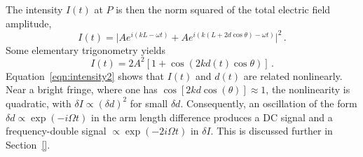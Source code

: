 \documentclass[paper-main.tex]{subfiles}
\begin{document}
The intensity $I(t)$ at $P$ is then the norm squared of the total electric field amplitude,
\begin{equation}
I(t) = \lvert A e^{i (k L - \omega t)}  + A e^{i (k (L + 2 d \cos{\theta}) - \omega t)} \rvert^2\,.
\label{eqn:intensity1}    
\end{equation}
Some elementary trigonometry yields
\begin{equation}
I(t) = 2 A^2 \left[ 1 + \cos{\left( 2 k d(t) \cos{\theta} \right) } \right]  \label{eqn:intensity2}\,.
\end{equation}
Equation~\ref{eqn:intensity2} shows that $I(t)$ and $d(t)$ are related nonlinearly. 
Near a bright fringe, where one has $\cos{[2kd\cos{(\theta)}]} \approx 1$, the nonlinearity is quadratic, with $\delta I \propto (\delta d)^2$ for small $\delta d$. 
Consequently, an oscillation of the form $\delta d \propto \exp{( -i \Omega t )}$ in the arm length difference produces a DC signal and a frequency-double signal $\propto \exp{(-2i\Omega t)}$ in $\delta I$. 
This is discussed further in Section~\ref{}. 





\end{document}
